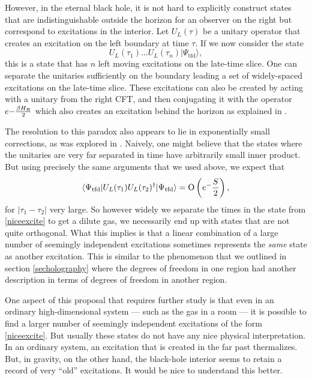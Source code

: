 \documentclass[12pt]{article}
\newcommand{\tfd}{\Psi_{\text{tfd}}} %
\def\Or[#1]{{\text{O}}\left({#1}\right)}
\newcommand{\be}{\begin{equation}}
\newcommand{\ee}{\end{equation}}
\begin{document}
However, in the eternal black hole,  it is not hard to explicitly construct states that are 
indistinguishable outside the horizon for an observer on the right but correspond to excitations in the interior.  Let $U_L(\tau)$ be a unitary operator that creates an excitation on the left boundary at time $\tau$. If we now consider the state
\be
\label{niceexcite}
U_L(\tau_1) \ldots U_L(\tau_n) |\tfd \rangle,
\ee
this is a state that has $n$ left moving excitations on the late-time slice. One can separate the unitaries sufficiently on the boundary leading a set of widely-spaced excitations on the late-time slice.  These excitations can also be created by acting with a unitary from the right CFT, and then conjugating it with the operator $e{-{\beta H_R \over 2}}$ which also creates an excitation behind the horizon as explained in \cite{Papadodimas:2017qit,deBoer:2018ibj}. 

The resolution to this paradox also appears to lie in exponentially small corrections, as was explored in \cite{Chakravarty:2020wdm, essay2020}. Naively, one might believe that the states where the unitaries are very far separated in time have arbitrarily small inner product. But using precisely the same arguments that we used above, we expect that
\be
\langle \tfd | U_L(\tau_1) U_L(\tau_2)^{\dagger} | \tfd \rangle = \Or[e^{-{S \over 2}}],
\ee
for $|\tau_1 - \tau_2|$ very large. So however widely we separate the times in the state from \eqref{niceexcite} to get a dilute gas, we necessarily end up with states that are not quite orthogonal. 
What this implies is that a linear combination of a large number of seemingly independent excitations sometimes represents the {\em same} state as another excitation. This is similar to the phenomenon that we outlined in section \ref{secholography} where the degrees of freedom in one region had another description in terms of degrees of freedom in another region.









 One aspect of this proposal that requires further study is that even in an ordinary high-dimensional system --- such as the gas in a room --- it is possible to find a larger number of seemingly independent excitations of the form \eqref{niceexcite}.  But usually these states do not have any nice physical interpretation. In an ordinary system, an excitation that is created in the far past thermalizes. But, in gravity, on the other hand, the black-hole interior seems to  retain a record of very ``old'' excitations. It would be nice to understand this better. 
\end{document}
